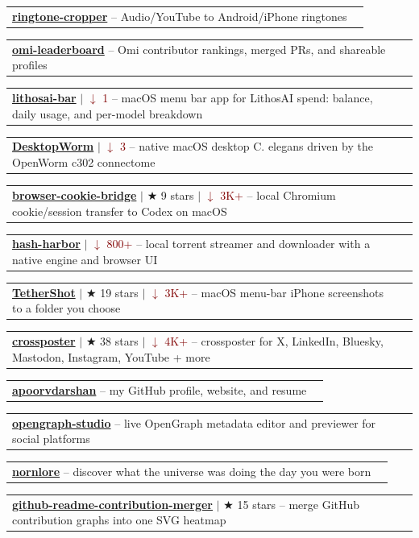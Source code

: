 \documentclass[letterpaper,11pt]{article}
\makeatletter
\newcommand{\resumeProjectHeading}[2]{
    \item
    \begin{tabular*}{0.97\textwidth}{l@{\extracolsep{\fill}}r}
      \small#1 & \hspace{8pt}\small#2 \\
    \end{tabular*}\vspace{-11.4pt}
}
\makeatother
\begin{document}
    \resumeProjectHeading{\textbf{\href{https://github.com/apoorvdarshan/ringtone-cropper}{ringtone-cropper}} \textnormal{ -- Audio/YouTube to Android/iPhone ringtones}}{}
    \resumeProjectHeading{\textbf{\href{https://github.com/apoorvdarshan/omi-leaderboard}{omi-leaderboard}} \textnormal{ -- Omi contributor rankings, merged PRs, and shareable profiles}}{}
    \resumeProjectHeading{\textbf{\href{https://github.com/apoorvdarshan/lithosai-bar}{lithosai-bar}} $|$ {\small \textcolor{Maroon}{$\downarrow$ 1}} \textnormal{ -- macOS menu bar app for LithosAI spend: balance, daily usage, and per-model breakdown}}{}
    \resumeProjectHeading{\textbf{\href{https://github.com/apoorvdarshan/DesktopWorm}{DesktopWorm}} $|$ {\small \textcolor{Maroon}{$\downarrow$ 3}} \textnormal{ -- native macOS desktop C. elegans driven by the OpenWorm c302 connectome}}{}
    \resumeProjectHeading{\textbf{\href{https://github.com/apoorvdarshan/browser-cookie-bridge}{browser-cookie-bridge}} $|$ {\small $\bigstar$ 9 stars $|$ \textcolor{Maroon}{$\downarrow$ 3K+}} \textnormal{ -- local Chromium cookie/session transfer to Codex on macOS}}{}
    \resumeProjectHeading{\textbf{\href{https://github.com/apoorvdarshan/hash-harbor}{hash-harbor}} $|$ {\small \textcolor{Maroon}{$\downarrow$ 800+}} \textnormal{ -- local torrent streamer and downloader with a native engine and browser UI}}{}
    \resumeProjectHeading{\textbf{\href{https://github.com/apoorvdarshan/TetherShot}{TetherShot}} $|$ {\small $\bigstar$ 19 stars $|$ \textcolor{Maroon}{$\downarrow$ 3K+}} \textnormal{ -- macOS menu-bar iPhone screenshots to a folder you choose}}{}
    \resumeProjectHeading{\textbf{\href{https://github.com/apoorvdarshan/crossposter}{crossposter}} $|$ {\small $\bigstar$ 38 stars $|$ \textcolor{Maroon}{$\downarrow$ 4K+}} \textnormal{ -- crossposter for X, LinkedIn, Bluesky, Mastodon, Instagram, YouTube + more}}{}
    \resumeProjectHeading{\textbf{\href{https://github.com/apoorvdarshan/apoorvdarshan}{apoorvdarshan}} \textnormal{ -- my GitHub profile, website, and resume}}{}
    \resumeProjectHeading{\textbf{\href{https://github.com/apoorvdarshan/opengraph-studio}{opengraph-studio}} \textnormal{ -- live OpenGraph metadata editor and previewer for social platforms}}{}
    \resumeProjectHeading{\textbf{\href{https://github.com/apoorvdarshan/nornlore}{nornlore}} \textnormal{ -- discover what the universe was doing the day you were born}}{}
    \resumeProjectHeading{\textbf{\href{https://github.com/apoorvdarshan/github-readme-contribution-merger}{github-readme-contribution-merger}} $|$ {\small $\bigstar$ 15 stars} \textnormal{ -- merge GitHub contribution graphs into one SVG heatmap}}{}
\end{document}
